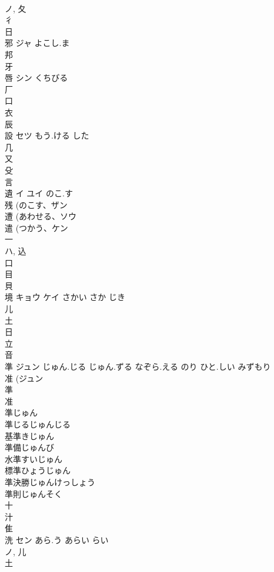 \documentclass[8pt]{extreport}
\begin{document}
\begin{CJK}{UTF8}{min}
\\	ノ, 夂 
\\	彳 
\\	日 
\\	邪	ジャ	よこし.ま	
\\	邦 
\\	牙 
\\	唇	シン	くちびる	
\\	厂 
\\	口 
\\	衣 
\\	辰 
\\	設	セツ	もう.ける した	
\\	几 
\\	又 
\\	殳 
\\	言 
\\	遺	イ ユイ	のこ.す	
\\	残 (のこす、ザン 
\\	遭 (あわせる、ソウ 
\\	遣 (つかう、ケン 
\\	一 
\\	ハ, 込 
\\	口 
\\	目 
\\	貝 
\\	境	キョウ ケイ	さかい さか じき	
\\	儿 
\\	土 
\\	日 
\\	立 
\\	音 
\\	準	ジュン	じゅん.じる じゅん.ずる なぞら.える のり ひと.しい みずもり	
\\	准 (ジュン 
\\	準 
\\	准 
\\	準じゅん
\\	準じるじゅんじる
\\	基準きじゅん
\\	準備じゅんび
\\	水準すいじゅん
\\	標準ひょうじゅん
\\	準決勝じゅんけっしょう
\\	準則じゅんそく
\\	十 
\\	汁 
\\	隹 
\\	洗	セン	あら.う あらい らい	
\\	ノ, 儿 
\\	土 

\end{CJK}
\end{document}
